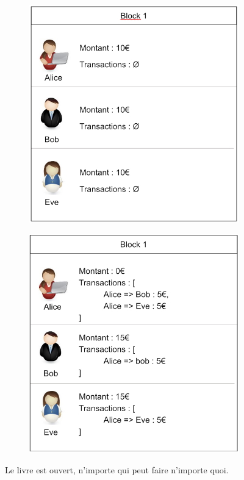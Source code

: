 \documentclass[12pt, a4paper, oneside]{book}
\begin{document}
    \begin{figure}[H]
        \centering
        \begin{subfigure}{.5\textwidth}
          \centering
          \includegraphics[width=.7\textwidth]{images/bloc1.png}
          \label{fig:bloc1}
        \end{subfigure}%
        \begin{subfigure}{.5\textwidth}
          \centering
          \includegraphics[width=.7\textwidth]{images/bloc2.png}
          \label{fig:bloc2}
        \end{subfigure}
        \caption{Le livre est ouvert, n'importe qui peut faire n'importe quoi.}
        \label{fig:test}
    \end{figure}
\end{document}
